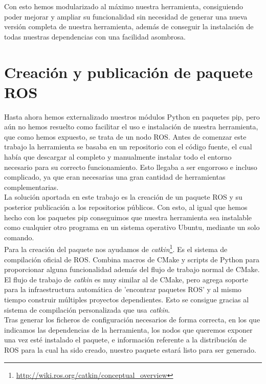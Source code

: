 Con esto hemos modularizado al máximo nuestra herramienta, consiguiendo poder mejorar y ampliar su funcionalidad sin necesidad de generar una nueva versión completa de nuestra herramienta, además de conseguir la instalación de todas nuestras dependencias con una facilidad asombrosa.
\section{Creación y publicación de paquete ROS}
\label{sec:paquete-ros}
Hasta ahora hemos externalizado nuestros módulos Python en paquetes pip, pero aún no hemos resuelto como facilitar el uso e instalación de nuestra herramienta, que como hemos expuesto, se trata de un nodo ROS. Antes de comenzar este trabajo la herramienta se basaba en un repositorio con el código fuente, el cual había que descargar al completo y manualmente instalar todo el entorno necesario para su correcto funcionamiento. Esto llegaba a ser engorroso e incluso complicado, ya que eran necesarias una gran cantidad de herramientas complementarias.\\

La solución aportada en este trabajo es la creación de un paquete ROS y su posterior publicación a los repositorios públicos. Con esto, al igual que hemos hecho con los paquetes pip conseguimos que nuestra herramienta sea instalable como cualquier otro programa en un sistema operativo Ubuntu, mediante un solo comando. \\

Para la creación del paquete nos ayudamos de \textit{catkin}\footnote{\url{http://wiki.ros.org/catkin/conceptual_overview}}. Es el sistema de compilación oficial de ROS. Combina macros de CMake y scripts de Python para proporcionar alguna funcionalidad además del flujo de trabajo normal de CMake. El flujo de trabajo de \textit{catkin} es muy similar al de CMake, pero agrega soporte para la infraestructura automática de 'encontrar paquetes ROS' y al mismo tiempo construir múltiples proyectos dependientes. Esto se consigue gracias al sistema de compilación personalizada que usa \textit{catkin}.\\

Tras generar los ficheros de configuración necesarios de forma correcta, en los que indicamos las dependencias de la herramienta, los nodos que queremos exponer una vez esté instalado el paquete, e información referente a la distribución de ROS para la cual ha sido creado, nuestro paquete estará listo para ser generado.\\

